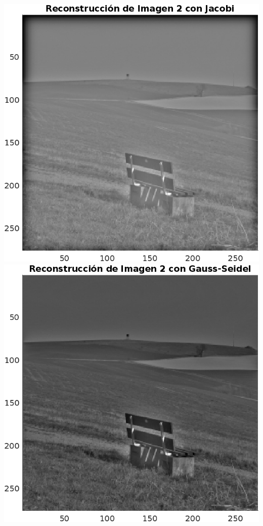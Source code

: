\begin{homeworkProblem}
\begin{solucion}
\begin{center}
      \includegraphics[scale=0.6]{Figures/Figure_2J.png}
      \includegraphics[scale=0.6]{Figures/Figure_2GS.png}

\end{center}
\end{solucion}
\end{homeworkProblem}
